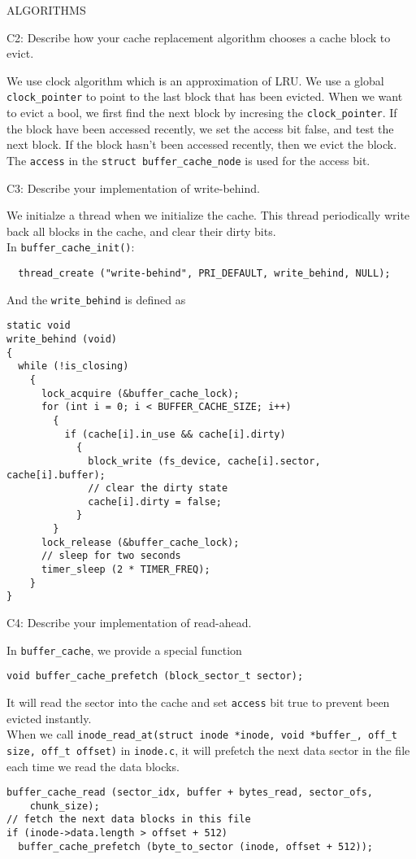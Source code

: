\begin{aspect}{ALGORITHMS}
  \begin{qc}
    C2: Describe how your cache replacement algorithm chooses a cache
    block to evict.
  \end{qc}
  We use clock algorithm which is an approximation of LRU. We use a global \lstinline{clock_pointer} to point to the last block that has been evicted. When we want to evict a bool, we first find the next block by incresing the \lstinline{clock_pointer}. If the block have been accessed recently, we set the access bit false, and test the next block. If the block hasn't been accessed recently, then we evict the block. The \lstinline{access} in the \lstinline{struct buffer_cache_node} is used for the access bit.
  \begin{qc}
    C3: Describe your implementation of write-behind.
  \end{qc}
  We initialze a thread when we initialize the cache. This thread periodically write back all blocks in the cache, and clear their dirty bits.\\
  In \lstinline{buffer_cache_init()}:
  \begin{lstlisting}
  thread_create ("write-behind", PRI_DEFAULT, write_behind, NULL);
  \end{lstlisting}
  And the \lstinline{write_behind} is defined as
  \begin{lstlisting}
static void
write_behind (void)
{
  while (!is_closing)
    {
      lock_acquire (&buffer_cache_lock);
      for (int i = 0; i < BUFFER_CACHE_SIZE; i++)
        {
          if (cache[i].in_use && cache[i].dirty)
            {
              block_write (fs_device, cache[i].sector, cache[i].buffer);
              // clear the dirty state
              cache[i].dirty = false;
            }
        }
      lock_release (&buffer_cache_lock);
      // sleep for two seconds
      timer_sleep (2 * TIMER_FREQ);
    }
}
  \end{lstlisting}
  \begin{qc}
    C4: Describe your implementation of read-ahead.
  \end{qc}
  In \texttt{buffer\_cache}, we provide a special function
  \begin{lstlisting}
void buffer_cache_prefetch (block_sector_t sector);
  \end{lstlisting}
  It will read the sector into the cache and set \lstinline{access} bit true to prevent been evicted instantly.\\
  When we call \lstinline{inode_read_at(struct inode *inode, void *buffer_, off_t size, off_t offset)} in \texttt{inode.c}, it will prefetch the next data sector in the file each time we read the data blocks.
  \begin{lstlisting}
buffer_cache_read (sector_idx, buffer + bytes_read, sector_ofs,
    chunk_size);
// fetch the next data blocks in this file
if (inode->data.length > offset + 512)
  buffer_cache_prefetch (byte_to_sector (inode, offset + 512));
  \end{lstlisting}
\end{aspect}

